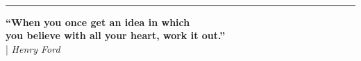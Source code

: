 \begin{titlepage}
		
			\ \vfill
			\rule{4cm}{0.4pt} \newline
			\newline
			\large\setlength{\leftskip}{2cm}
			\textbf{{``When you once get an idea in which\\ you believe 
			with all your heart, work it out.'' }}
			\large\setlength{\leftskip}{8.5cm}
			\vspace{0.5cm} \\
			| \textit{Henry Ford}
			\vspace{1cm}
			\setlength{\leftskip}{0cm}
			\normalsize 
			\thispagestyle{empty} 
		\newpage{} \mbox{} 
		\thispagestyle{empty}
	\end{titlepage}
	\makeatother\
\thispagestyle {normalpage}

